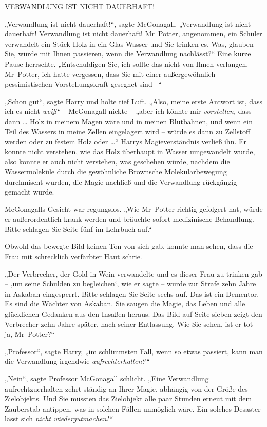 {\uline{VERWANDLUNG IST NICHT DAUERHAFT!}

„Verwandlung ist nicht dauerhaft!“, sagte McGonagall. „Verwandlung ist nicht dauerhaft! Verwandlung ist nicht dauerhaft! Mr~Potter, angenommen, ein Schüler verwandelt ein Stück Holz in ein Glas Wasser und Sie trinken es. Was, glauben Sie, würde mit Ihnen passieren, wenn die Verwandlung nachlässt?“ Eine kurze Pause herrschte. „Entschuldigen Sie, ich sollte das nicht von Ihnen verlangen, Mr~Potter, ich hatte vergessen, dass Sie mit einer außergewöhnlich pessimistischen Vorstellungskraft gesegnet sind --“

„Schon gut“, sagte Harry und holte tief Luft. „Also, meine erste Antwort ist, dass ich es nicht \emph{weiß“} -- McGonagall nickte -- „aber ich könnte mir \emph{vorstellen,} dass dann … Holz in meinem Magen wäre und in meinen Blutbahnen, und wenn ein Teil des Wassers in meine Zellen eingelagert wird -- würde es dann zu Zellstoff werden oder zu festem Holz oder …“ Harrys Magieverständnis verließ ihn. Er konnte nicht verstehen, wie das Holz überhaupt in Wasser umgewandelt wurde, also konnte er auch nicht verstehen, was geschehen würde, nachdem die Wassermoleküle durch die gewöhnliche Brownsche Molekularbewegung durchmischt wurden, die Magie nachließ und die Verwandlung rückgängig gemacht wurde.

McGonagalls Gesicht war regungslos. „Wie Mr~Potter richtig gefolgert hat, würde er außerordentlich krank werden und bräuchte sofort medizinische Behandlung. Bitte schlagen Sie Seite fünf im Lehrbuch auf.“

Obwohl das bewegte Bild keinen Ton von sich gab, konnte man sehen, dass die Frau mit schrecklich verfärbter Haut schrie.

„Der Verbrecher, der Gold in Wein verwandelte und es dieser Frau zu trinken gab -- ‚um seine Schulden zu begleichen`, wie er sagte -- wurde zur Strafe zehn Jahre in Askaban eingesperrt. Bitte schlagen Sie Seite sechs auf. Das ist ein Dementor. Es sind die Wächter von Askaban. Sie saugen die Magie, das Leben und alle glücklichen Gedanken aus den Insaßen heraus. Das Bild auf Seite sieben zeigt den Verbrecher zehn Jahre später, nach seiner Entlassung. Wie Sie sehen, ist er tot -- ja, Mr~Potter?“

„Professor“, sagte Harry, „im schlimmsten Fall, wenn so etwas passiert, kann man die Verwandlung irgendwie \emph{aufrechterhalten?“}

„Nein“, sagte Professor McGonagall schlicht. „Eine Verwandlung aufrechtzuerhalten zehrt ständig an Ihrer Magie, abhängig von der Größe des Zielobjekts. Und Sie müssten das Zielobjekt alle paar Stunden erneut mit dem Zauberstab antippen, was in solchen Fällen unmöglich wäre. Ein solches Desaster lässt sich \emph{nicht wiedergutmachen!“}

}
